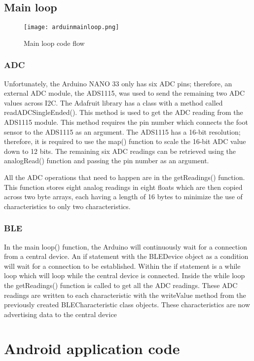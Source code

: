 \subsection{Main loop}
\begin{figure}[!htb]
  \centering
  \texttt{[image: arduinmainloop.png]}
  \caption{Main loop code flow}
  \label{fig:mainloop}
\end{figure}
\subsubsection{ADC} 

Unfortunately, the Arduino NANO 33 only has six ADC pins; therefore, an external ADC module, the ADS1115, was used to send the remaining two ADC values across I2C. The Adafruit library has a class with a method called readADCSingleEnded(). This method is used to get the ADC reading from the ADS1115 module. This method requires the pin number which connects the foot sensor to the ADS1115 as an argument. The ADS1115 has a 16-bit resolution; therefore, it is required to use the map() function to scale the 16-bit ADC value down to 12 bits. The remaining six ADC readings can be retrieved using the analogRead() function and passing the pin number as an argument.

All the ADC operations that need to happen are in the getReadings() function. This function stores eight analog readings in eight floats which are then copied across two byte arrays, each having a length of 16 bytes to minimize the use of characteristics to only two characteristics.

\subsubsection{BLE}

In the main loop() function, the Arduino will continuously wait for a connection from a central device. An if statement with the BLEDevice object as a condition will wait for a connection to be established. Within the if statement is a while loop which will loop while the central device is connected. Inside the while loop the getReadings() function is called to get all the ADC readings. These ADC readings are written to each characteristic with the writeValue method from the previously created BLECharacteristic class objects. These characteristics are now advertising data to the central device



\section{Android application code}
